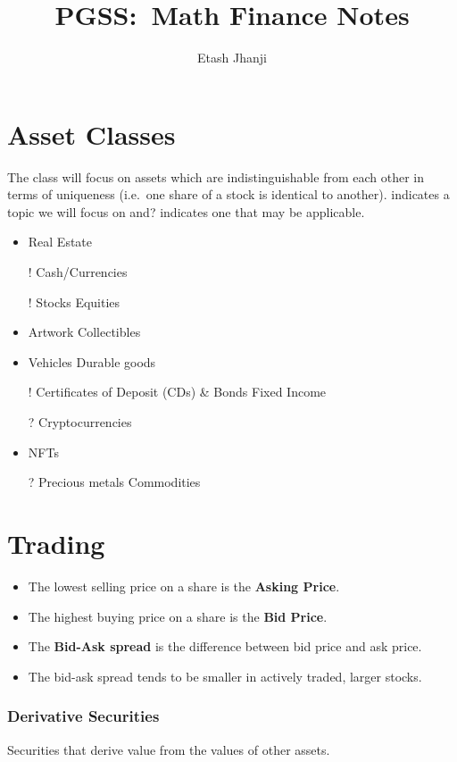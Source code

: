 \documentclass[12pt,letterpaper, twocolumn]{article}
\author{Etash Jhanji}
\title{PGSS:\ Math Finance Notes}
\date{}
\begin{document}
\maketitle


\section{Asset Classes}
The class will focus on assets which are indistinguishable from each other in terms of uniqueness (i.e.\ one share of a stock is identical to another). \! indicates a topic we will focus on and? indicates one that may be applicable. 
    \begin{itemize}
        \setlength\itemsep{0.5em}
        \item Real Estate
        \item[!] Cash/Currencies
        \item[!] Stocks \textrightarrow{} Equities
        \item Artwork \textrightarrow{} Collectibles 
        \item Vehicles \textrightarrow{} Durable goods
        \item[!] Certificates of Deposit (CDs) \& Bonds \textrightarrow{} Fixed Income
        \item[?] Cryptocurrencies
        \item NFTs
        \item[?] Precious metals \textrightarrow{} Commodities
    \end{itemize}

\section{Trading}
\begin{itemize}
    \setlength\itemsep{0.25em}
    \item The lowest selling price on a share is the \textbf{Asking Price}. 
    \item The highest buying price on a share is the \textbf{Bid Price}. 
    \item The \textbf{Bid-Ask spread} is the difference between bid price and ask price. 
    \item The bid-ask spread tends to be smaller in actively traded, larger stocks. 
\end{itemize}
\subsubsection*{Derivative Securities}
Securities that derive value from the values of other assets. 
\end{document}
